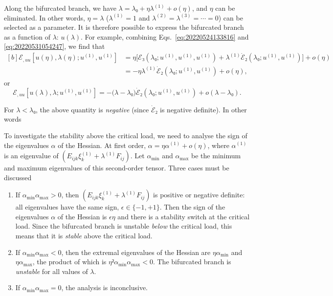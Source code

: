 \documentclass[12pt, final]{scrartcl}
\theoremstyle{definition}
\newcommand{\order}[2][1]{#2^{(#1)}}
\begin{document}
Along the bifurcated branch, we have $λ = λ₀ + η \order[1]λ + o(η)$, and $η$ can be
eliminated. In other words, $η=λ$ ($\order[1]λ=1$ and $\order[2]λ = \order[3]λ = \cdots = 0$) can
be selected as a parameter. It is therefore possible to express the bifurcated
branch as a function of $λ$: $u(λ)$. For example, combining
Eqs.~\eqref{eq:20220524133816} and \eqref{eq:20220531054247}, we find that
\begin{equation}
  \begin{aligned}[b]
    ℰ_{, uu}[u(η), λ(η); \order[1]u, \order[1]u]
    &= η \bigl[ℰ₃(λ₀ ; \order[1]u, \order[1]u, \order[1]u)  + \order[1]λ \dot{ℰ}₂(λ₀; \order[1]u, \order[1]u)\bigr] + o(η)\\
    &= - η \order[1]λ \dot{ℰ}₂(λ₀; \order[1]u, \order[1]u) + o(η),
  \end{aligned}
\end{equation}
or
\begin{equation}
  \label{eq:20220819160235}
  ℰ_{, uu}[u(λ), λ; \order[1]u, \order[1]u] = -\bigl( λ - λ₀ \bigr) \dot{ℰ}₂(λ₀; \order[1]u, \order[1]u) + o(λ - λ₀).
\end{equation}

For $λ < λ₀$, the above quantity is \emph{negative} (since $\dot{ℰ}₂$ is
negative definite). In other words

\begin{center}
\end{center}

To investigate the stability above the critical load, we need to analyse the
sign of the eigenvalues $α$ of the Hessian. At first order,
$α = η \order[1]α + o(η)$, where $\order[1]α$ is an eigenvalue of
$(E_{ijk} \order[1]{ξ_k} + \order[1]λ F_{ij})$. Let $α_{\min}$ and $α_{\max}$ be the minimum
and maximum eigenvalues of this second-order tensor. Three cases must be
discussed
\begin{enumerate}
\item If $α_{\min} α_{\max} > 0$, then $(E_{ijk} \order[1]{ξ_k} + \order[1]λ F_{ij})$ is
  positive or negative definite: all eigenvalues have the same sign,
  $\epsilon ∈ \{-1, +1\}$. Then the sign of the eigenvalues $α$ of the
  Hessian is $\epsilon η$ and there is a stability switch at the critical
  load. Since the bifurcated branch is unstable \emph{below} the critical load,
  this means that it is \emph{stable} above the critical load.
\item If $α_{\min} α_{\max} < 0$, then the extremal eigenvalues of the Hessian
  are $η α_{\min}$ and $η α_{\max}$, the product of which is
  $η² α_{\min} α_{\max} < 0$. The bifurcated branch is \emph{unstable} for all
  values of $λ$.
\item If $α_{\min} α_{\max} = 0$, the analysis is inconclusive.
\end{enumerate}
\end{document}
